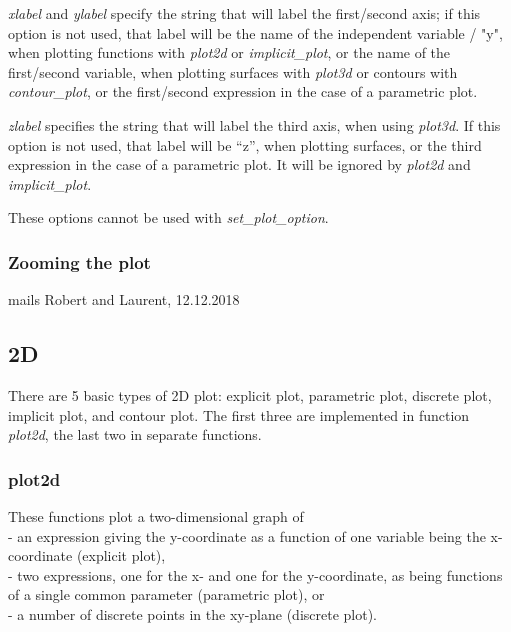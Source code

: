 \documentclass[../Maxima_Workbook.tex]{subfiles}
\begin{document}
 \hfill {}

 \hfill {}

\lz \emph{xlabel} and \emph{ylabel} specify the string that will label the first/second axis; if this option is not used, that label
will be the name of the independent variable / "y", when plotting functions with \emph{plot2d} or \emph{implicit\_plot}, or the name of the first/second variable, when plotting surfaces with \emph{plot3d} or contours with \emph{contour\_plot}, or the first/second expression in the case of a parametric plot.

\lz \emph{zlabel} specifies the string that will label the third axis, when using \emph{plot3d}. If this option is not used, that label will be “z”, when plotting surfaces, or the third expression in the case of a parametric plot. It will be ignored by \emph{plot2d} and \emph{implicit\_plot}.

\lz These options cannot be used with \emph{set\_plot\_option}.

\subsubsection{Zooming the plot}

mails Robert and Laurent, 12.12.2018

\subsection{2D}

There are 5 basic types of 2D plot: explicit plot, parametric plot, discrete plot, implicit plot, and contour plot. The first three are implemented in function \emph{plot2d}, the last two in separate functions.

\subsubsection{plot2d}

\lz {} \hfill \tcr{[function]}

 \hfill \tcr{[function]}

\lz These functions plot a two-dimensional graph of \\
- an expression giving the y-coordinate as a function of one variable being the x-coordinate (explicit plot), \\
- two expressions, one for the x- and one for the y-coordinate, as being functions of a single common parameter (parametric plot), or \\
- a number of discrete points in the xy-plane (discrete plot). 
\end{document}

